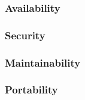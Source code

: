 
\subsubsection{Availability}


\subsubsection{Security}


\subsubsection{Maintainability}


\subsubsection{Portability}

